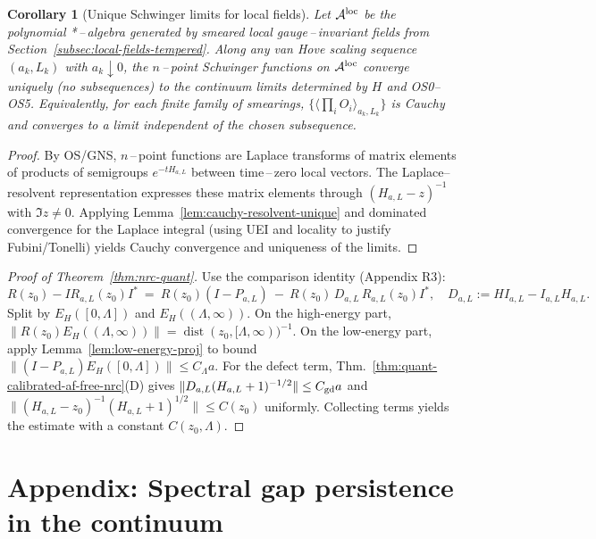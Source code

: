 \documentclass[11pt]{amsart}
\theoremstyle{plain}
\newtheorem{corollary}[theorem]{Corollary}
\theoremstyle{definition}
\theoremstyle{remark}
\begin{document}
\begin{corollary}[Unique Schwinger limits for local fields]\label{cor:unique-schwinger-local}
Let $\mathcal A^{\rm loc}$ be the polynomial *\,–\,algebra generated by smeared local gauge\,–\,invariant fields from Section~\ref{subsec:local-fields-tempered}. Along any van Hove scaling sequence $(a_k,L_k)$ with $a_k\downarrow 0$, the $n$\,–\,point Schwinger functions on $\mathcal A^{\rm loc}$ converge uniquely (no subsequences) to the continuum limits determined by $H$ and OS0--OS5. Equivalently, for each finite family of smearings, $\{\langle \prod_i O_i\rangle_{a_k,L_k}\}$ is Cauchy and converges to a limit independent of the chosen subsequence.
\end{corollary}

\begin{proof}
By OS/GNS, $n$\,–\,point functions are Laplace transforms of matrix elements of products of semigroups $e^{-tH_{a,L}}$ between time\,–\,zero local vectors. The Laplace–resolvent representation expresses these matrix elements through $(H_{a,L}-z)^{-1}$ with $\Im z\ne 0$. Applying Lemma~\ref{lem:cauchy-resolvent-unique} and dominated convergence for the Laplace integral (using UEI and locality to justify Fubini/Tonelli) yields Cauchy convergence and uniqueness of the limits.
\end{proof}

\begin{proof}[Proof of Theorem~\ref{thm:nrc-quant}]
Use the comparison identity (Appendix R3):
\[
  R(z_0)-I R_{a,L}(z_0) I^*\ =\ R(z_0)(I-P_{a,L})\ -\ R(z_0)\,D_{a,L}\,R_{a,L}(z_0) I^*,\quad D_{a,L}:=H I_{a,L}-I_{a,L}H_{a,L}.
\]
Split by $E_H([0,\Lambda])$ and $E_H((\Lambda,\infty))$. On the high-energy part, $\|R(z_0) E_H((\Lambda,\infty))\|=\operatorname{dist}(z_0,[\Lambda,\infty))^{-1}$. On the low-energy part, apply Lemma~\ref{lem:low-energy-proj} to bound $\|(I-P_{a,L})E_H([0,\Lambda])\|\le C_\Lambda a$. For the defect term, Thm.~\ref{thm:quant-calibrated-af-free-nrc}(D) gives $\|D_{a,L}(H_{a,L}+1)^{-1/2}\|\le C_{\rm gd} a$ and $\|(H_{a,L}-z_0)^{-1}(H_{a,L}+1)^{1/2}\|\le C(z_0)$ uniformly. Collecting terms yields the estimate with a constant $C(z_0,\Lambda)$.
\end{proof}

\medskip
\section{Appendix: Spectral gap persistence in the continuum}
\end{document}
